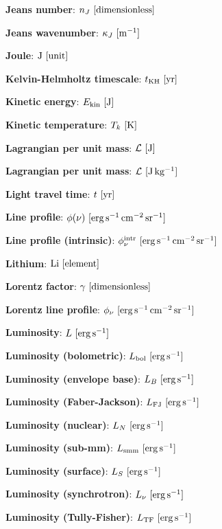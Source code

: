 \documentclass[a4paper,10pt]{article}
\begin{document}
{\noindent}\textbf{Jeans number}: $n_J ~ [{\rm dimensionless}]$

{\noindent}\textbf{Jeans wavenumber}: $\kappa_J ~ [{\rm m^{-1}}]$

{\noindent}\textbf{Joule}: ${\rm J} ~ [{\rm unit}]$

{\noindent}\textbf{Kelvin-Helmholtz timescale}: $t_{\rm KH} ~ [{\rm yr}]$

{\noindent}\textbf{Kinetic energy}: $E_\mathrm{kin} ~ [{\rm J}]$

{\noindent}\textbf{Kinetic temperature}: $T_k ~ [{\rm K}]$

{\noindent}\textbf{Lagrangian per unit mass}: $\mathcal{L} ~ [{\rm J}]$

{\noindent}\textbf{Lagrangian per unit mass}: $\mathcal{L} ~ [{\rm J\,kg^{-1}}]$

{\noindent}\textbf{Light travel time}: $t ~ [{\rm yr}]$

{\noindent}\textbf{Line profile}: $\phi(\nu) ~ [{\rm erg\,s^{-1}\,cm^{-2}\,sr^{-1}}]$

{\noindent}\textbf{Line profile (intrinsic)}: $\phi_\nu^{\rm intr} ~ [{\rm erg\,s^{-1}\,cm^{-2}\,sr^{-1}}]$

{\noindent}\textbf{Lithium}: ${\rm Li} ~ [{\rm element}]$

{\noindent}\textbf{Lorentz factor}: $\gamma ~ [{\rm dimensionless}]$

{\noindent}\textbf{Lorentz line profile}: $\phi_\nu ~ [{\rm erg\,s^{-1}\,cm^{-2}\,sr^{-1}}]$

{\noindent}\textbf{Luminosity}: $L ~ [{\rm erg\,s^{-1}}]$

{\noindent}\textbf{Luminosity (bolometric)}: $L_{\rm bol} ~ [{\rm erg\,s^{-1}}]$

{\noindent}\textbf{Luminosity (envelope base)}: $L_B ~ [{\rm erg\,s^{-1}}]$

{\noindent}\textbf{Luminosity (Faber-Jackson)}: $L_\mathrm{FJ} ~ [{\rm erg\,s^{-1}}]$

{\noindent}\textbf{Luminosity (nuclear)}: $L_N ~ [{\rm erg\,s^{-1}}]$

{\noindent}\textbf{Luminosity (sub-mm)}: $L_{\rm smm} ~ [{\rm erg\,s^{-1}}]$

{\noindent}\textbf{Luminosity (surface)}: $L_S ~ [{\rm erg\,s^{-1}}]$

{\noindent}\textbf{Luminosity (synchrotron)}: $L_\nu ~ [{\rm erg\,s^{-1}}]$

{\noindent}\textbf{Luminosity (Tully-Fisher)}: $L_\mathrm{TF} ~ [{\rm erg\,s^{-1}}]$
\end{document}
